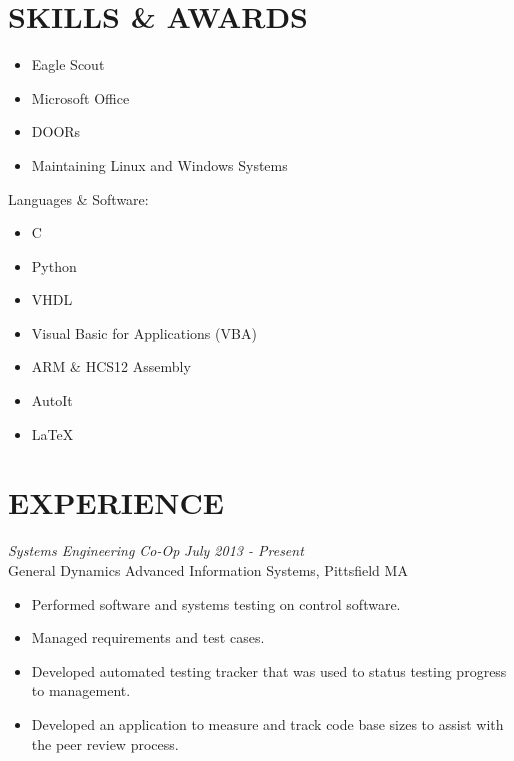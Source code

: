 \documentclass[line,margin]{res}
\begin{document}
\begin{resume}
\section{SKILLS \& AWARDS} 
		\begin{multicols}{2}
			\begin{itemize}
				\itemsep -2pt
				\item[] Eagle Scout
				\item[] Microsoft Office
				\item[] DOORs
				\item[] Maintaining Linux and Windows Systems

			\end{itemize}
		\end{multicols}
	\vspace{-10pt}
	{Languages \& Software:} %
		\begin{multicols}{2}
			\begin{itemize}
				\itemsep -2pt
				\item[] C
				\item[] Python
				\item[] VHDL
				\item[] Visual Basic for Applications (VBA)
				\item[] ARM \& HCS12 Assembly
				\item[] AutoIt
				\item[] \LaTeX 
			\end{itemize}
		\end{multicols}
\section{EXPERIENCE} 
{\sl Systems Engineering Co-Op} \hfill {\sl July 2013 - Present }\\
	General Dynamics Advanced Information Systems, Pittsfield MA
	\begin{itemize}  \itemsep -2pt %
			\item Performed software and systems testing on 
				control software. 
			\item Managed requirements and test cases.
			\item Developed automated testing tracker
				that was used to status testing progress
				to management. 
			\item Developed an application to measure and track 
				code base sizes to assist with the peer review process.
	\end{itemize}
 

\end{resume}
\end{document}
